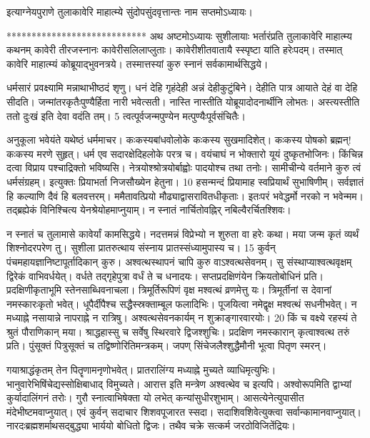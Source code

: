 इत्याग्नेयपुराणे तुलाकावेरि माहात्म्ये सुंदोपसुंदवृत्तान्तः नाम सप्तमोऽध्यायः।

****************************
अथ अष्टमोऽध्यायः सुशीलायाः भर्तारंप्रति तुलाकावेरि माहात्म्य कथनम् कावेरी तीरजस्नानः कावेरीसलिलाप्लुताः।
 कावेरीशीतवातायै स्स्पृष्टा यांति हरेःपदम्।
 तस्मात् कावेरि माहात्म्यं कोब्रूयाद्भुवनत्रये।
 तस्मात्तस्यां कुरु स्नानं सर्वकामार्थसिद्धये।
 
धर्मसारं प्रवक्ष्यामि मन्नाथाभीष्ठदं शृणु।
 धनं देहि गृहंदेही अन्नं देहीकुटुंबिने।
 देहीति पात्र आयाते देहं वा देहि सीदति।
 जन्मांतरकृतैःपुण्यैर्हिता नारी भवेत्सती।
 नास्ति नास्तीति योब्रूयादोदनार्थीनि लोभतः।
 अस्त्यस्तीति ततो दुःखं इति देवा वदंति तम्।
 5 त्वत्पूर्वजन्मपुण्येन मत्पुण्यैःपूर्वसंचितैः।
 
अनुकूला भवेयंते यथेष्ठं धर्ममाचर।
 कःकस्यबांधवोलोके कःकस्य सुखमादिशेत्।
 कःकस्य पोषको ब्रह्मन्! कःकस्य मरणे सुहृत्।
 धर्म एव सदारक्षेदिहलोके परत्र च।
 वयंचाघं न भोक्तारो यूयं दुष्कृतभोजिनः।
 किंचिन्न दत्वा विप्राय पश्चाद्रिक्तो भविष्यसि।
 नेत्रयोश्श्रोत्रयोर्बाह्वोः पादयोश्च तथा तनोः।
 सामीचीन्ये वर्तमाने कुरु त्वं धर्मसंग्रहम्।
 इत्युक्तः प्रियाभर्ता निजसौख्येन हेतुना।
 10 हसन्मन्दं प्रियामाह स्वप्रियार्थं सुभाषिणीम्।
 सर्वज्ञातं हि कल्याणि दैवं हि बलवत्तरम्।
 ममैतावत्प्रियो मौढ्याद्वासरावितधीकृताः।
 इतःपरं भवेद्धर्मो नरको न भवेन्मम।
 तद्ब्रह्येकं विनिश्चित्य येनश्रेयोहमाप्नुयाम्।
 न स्नातं नार्चितोवह्निर् नबिल्वैरर्चितश्शिवः।
 
न स्नातं च तुलामासे कावेर्यां कामसिद्धये।
 नदत्तमन्नं विप्रेभ्यो न शुरुता वा हरेः कथा।
 मया जन्म कृतं व्यर्थं शिश्नोदरपरेण तु।
 सुशीला
प्रातरुत्थाय संस्नाय प्रातस्संध्यामुपास्य च।
 15 कुर्वन् पंचमहायज्ञानिष्टापूर्तादिकान् कुरु।
 अश्वत्थस्थापनं चापि कुरु वाऽश्वत्थसेवनम्।
 सु संस्थाप्याश्वत्थवृक्षम् द्विरेकं वाभिवर्धयेत्।
 वर्धते तद्गृहेपुत्रा वर्धं ते च धनादयः।
 सप्तप्रदक्षिणंयेन क्रियतोबोधिनं प्रति।
 प्रदक्षिणीकृताभूमि स्तेनसाब्धिवनाचला।
 त्रिमूर्तिरूपिणं वृक्ष मश्वत्थं व्रणमेत्तु यः।
 त्रिमूर्तीनां स देवानां नमस्कारःकृतो भवेत्।
 धूपैर्दीपैश्च सद्धैस्स्रक्ताम्बूल फलादिभिः।
 पूजयित्वा नमेद्वृक्ष मश्वत्थं सधनीभवेत्।
 न मध्याह्ने नसायान्ने नापराह्ने न रात्रिषु।
 अश्वत्थसेवनकार्यम् न शुक्राङ्गारवारयोः।
 20 किं च वक्ष्ये रहस्यं ते श्रुतं पौराणिकान् मया।
 श्राद्धहास्सु च सर्वेषु स्थिरवारे द्विजश्शुचिः।
 प्रदक्षिण नमस्कारान् कृत्वाश्वत्थ तरुं प्रति।
 पुंसूक्तं पित्रुसूक्तं च तद्विष्णोरितिमन्त्रकम्।
 जपण् सिंचेजलैश्शुद्धैमौनी भूत्वा पितृण स्मरन्।
 
गयाश्राद्धंकृतम् तेन पितॄणामनृणोभवेत्।
 प्रातरालिंग्य मध्याह्ने मुच्यते व्याधिमृत्युभिः।
 भानुवारेभिषिंचेद्यस्सोक्षिबाधाद् विमुच्यते।
 आरात्त इति मन्त्रेण अश्वत्थेव च इत्यपि।
 अश्वोरूपमिति द्वाभ्यां कुर्यादालिंगनं तरोः।
 गुरौ स्नात्वाभिषेक्ता यो लभेत् कन्यांसुधीरशुभाम्।
 आसत्येनेत्युपासीत मंदेभीष्टमवाप्नुयात्।
 एवं कुर्वन् सदाचार शिशवपूजारत स्सदा।
 सदाशिवशिवेत्युक्त्वा सर्वान्कामानवाप्नुयात्।
 नारदःब्रह्मशर्माथसद्बुद्ध्या भार्ययो बोधितो द्विजः।
 तथैव चक्रे सत्कर्म जरठोविजितेंद्रियः।
 
